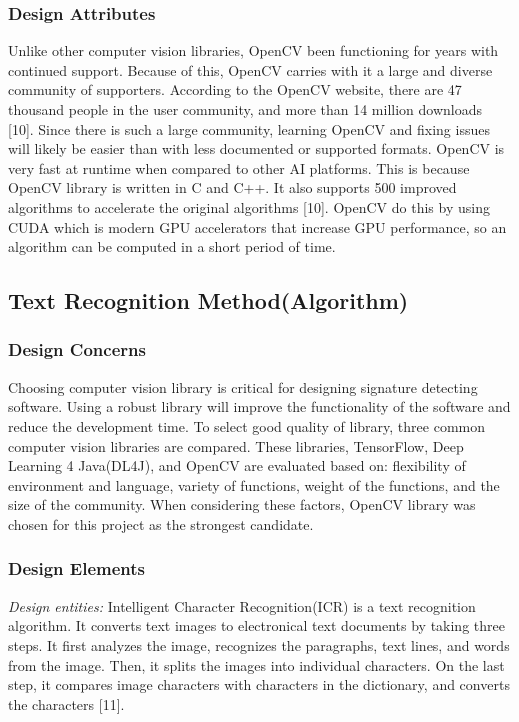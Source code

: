\documentclass[onecolumn, draftclsnofoot,10pt, compsoc]{IEEEtran}
\begin{document}
\subsubsection{Design Attributes}
Unlike other computer vision libraries, OpenCV been functioning for years with continued support. Because of this, OpenCV carries with it a large and diverse community of supporters. According to the OpenCV website, there are 47 thousand people in the user community, and more than 14 million downloads [10]. Since there is such a large community, learning OpenCV and fixing issues will likely be easier than with less documented or supported formats.
OpenCV is very fast at runtime when compared to other AI platforms. This is because OpenCV library is written in C and C++. It also supports 500 improved algorithms to accelerate the original algorithms [10].  OpenCV do this by using CUDA which is modern GPU accelerators that increase GPU performance, so an algorithm can be computed in a short period of time.

\subsection{Text Recognition Method(Algorithm)}
\subsubsection{Design Concerns}
Choosing computer vision library is critical for designing signature detecting software. Using a robust library will improve the functionality of the software and reduce the development time. To select good quality of library, three common computer vision libraries are compared. These libraries, TensorFlow, Deep Learning 4 Java(DL4J), and OpenCV are evaluated based on: flexibility of environment and language, variety of functions, weight of the functions, and the size of the community. When considering these factors, OpenCV library was chosen for this project as the strongest candidate.

\subsubsection{Design Elements}
	\emph{Design entities:}
Intelligent Character Recognition(ICR) is a text recognition algorithm. It converts text images to electronical text documents by taking three steps. It first analyzes the image, recognizes the paragraphs, text lines, and words from the image. Then, it splits the images into individual characters. On the last step, it compares image characters with characters in the dictionary, and converts the characters [11]. 
\end{document}

